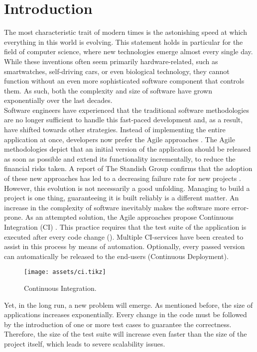 
\section{Introduction}
\noindent The most characteristic trait of modern times is the astonishing speed at which everything in this world is evolving. This statement holds in particular for the field of computer science, where new technologies emerge almost every single day. While these inventions often seem primarily hardware-related, such as smartwatches, self-driving cars, or even biological technology, they cannot function without an even more sophisticated software component that controls them. As such, both the complexity and size of software have grown exponentially over the last decades.\\

\noindent Software engineers have experienced that the traditional software methodologies are no longer sufficient to handle this fast-paced development and, as a result, have shifted towards other strategies. Instead of implementing the entire application at once, developers now prefer the Agile approaches \cite{beck2001agile}. 
The Agile methodologies depict that an initial version of the application should be released as soon as possible and extend its functionality incrementally, to reduce the financial risks taken. A report of The Standish Group confirms that the adoption of these new approaches has led to a decreasing failure rate for new projects \cite{standish2015chaos}.\\

\noindent However, this evolution is not necessarily a good unfolding. Managing to build a project is one thing, guaranteeing it is built reliably is a different matter. An increase in the complexity of software inevitably makes the software more error-prone. As an attempted solution, the Agile approaches propose Continuous Integration (CI) \cite{SmartJenkinsDefinitive}. This practice requires that the test suite of the application is executed after every code change (). Multiple CI-services have been created to assist in this process by means of automation. Optionally, every passed version can automatically be released to the end-users (Continuous Deployment).

\begin{figure}[h!]
	\centering
	\texttt{[image: assets/ci.tikz]}
	\caption{Continuous Integration.}
	\label{fig:ext-en-ci}
\end{figure}

\noindent Yet, in the long run, a new problem will emerge. As mentioned before, the size of applications increases exponentially. Every change in the code must be followed by the introduction of one or more test cases to guarantee the correctness. Therefore, the size of the test suite will increase even faster than the size of the project itself, which leads to severe scalability issues.